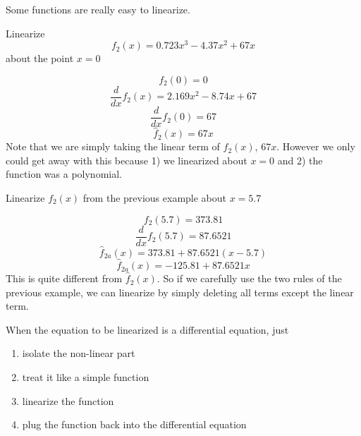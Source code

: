 Some functions are really easy to linearize.

\begin{ExampleSmall}
Linearize
\[
f_2(x) = 0.723x^3 -4.37x^2 +67x
\]
about the point $x=0$
\vspace{0.2in}

\[
f_2(0) = 0
\]
\[
\frac{d}{dx}{f}_2(x) = 2.169x^2 - 8.74x + 67
\]
\[
\frac{d}{dx}{f}_2(0) = 67
\]
\[
\hat{f}_2(x) =  67x
\]
Note that we are simply taking the linear term of $f_2(x)$, $67x$.  
However we only could get away with this because 1) we linearized about $x=0$ and 2) the function was a polynomial.
\end{ExampleSmall}

\begin{ExampleSmall}
Linearize $f_2(x)$ from the previous example about $x=5.7$
\vspace{0.2in}

\[
f_2(5.7) = 373.81
\]
\[
\frac{d}{dx}{f}_2(5.7) = 87.6521
\]
\[
\hat{f}_{2a}(x) = 373.81 + 87.6521(x-5.7)
\]
\[
\hat{f}_{2a}(x) = -125.81 + 87.6521x
\]
This is quite different from $\hat{f}_2(x)$.  So if we carefully use the two rules of the previous example, we 
can linearize by simply deleting all terms except the linear term. 

\end{ExampleSmall}


When the equation to be linearized is a differential equation, 
just 

\begin{enumerate}
  \item isolate the non-linear part
  \item treat it like a simple function
  \item linearize the function
  \item plug the function back into the differential equation
\end{enumerate}
 
